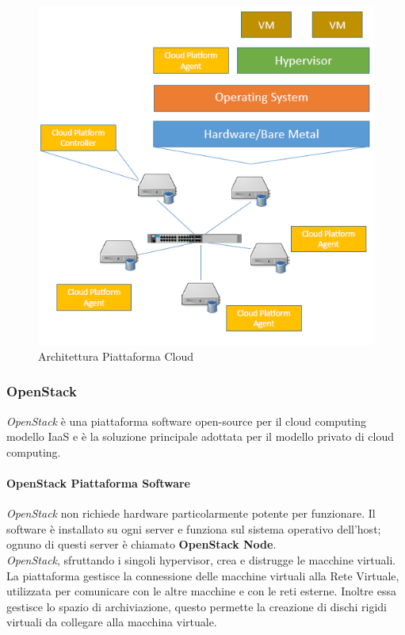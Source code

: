 \documentclass{article}
\begin{document}
\begin{figure}[H]
    \centering
    \includegraphics[scale=0.5]{img/cp_architecture.png}
    \caption{Architettura Piattaforma Cloud}
\end{figure}\noindent

\subsubsection{OpenStack}
\textit{OpenStack} è una piattaforma software open-source per il cloud computing modello IaaS e è la soluzione principale adottata per il modello privato di cloud computing.

\paragraph{OpenStack Piattaforma Software}
\textit{OpenStack} non richiede hardware particolarmente potente per funzionare. Il software è installato su ogni server e funziona sul sistema operativo dell'host; ognuno di questi server è chiamato \textbf{OpenStack Node}.\\
\textit{OpenStack}, sfruttando i singoli hypervisor, crea e distrugge le macchine virtuali.
La piattaforma gestisce la connessione delle macchine virtuali alla Rete Virtuale, utilizzata per comunicare con le altre macchine e con le reti esterne.
Inoltre essa gestisce lo spazio di archiviazione, questo permette la creazione di dischi rigidi virtuali da collegare alla macchina virtuale.
\end{document}
